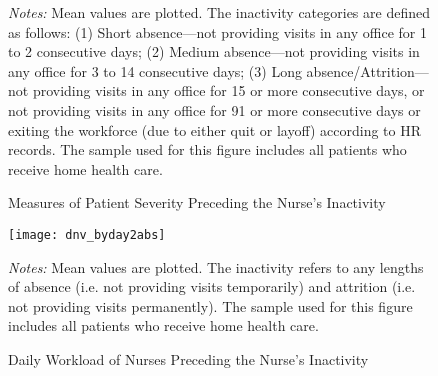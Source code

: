 \documentclass[final,12pt, notitlepage]{article}
\begin{document}
\begin{singlespace}
\graphicspath{ {/Users/kimk13/Dropbox/Wharton/Research/Labor/gph/anhandoff/} }
\begin{figure}[H]
\centering
{}
\begin{minipage}{\linewidth}
\footnotesize
\justify
\emph{Notes:} Mean values are plotted.
The inactivity categories are defined as follows:
(1) Short absence---not providing visits in any office for 1 to 2 consecutive days;
(2) Medium absence---not providing visits in any office for 3 to 14 consecutive days;
(3) Long absence/Attrition---not providing visits in any office for 15 or more consecutive days, or not providing visits in any office for 91 or more consecutive days or exiting the workforce (due to either quit or layoff) according to HR records.
The sample used for this figure includes all patients who receive home health care.
\end{minipage}
\caption[Measures of Patient Severity Preceding the Nurse's Inactivity]%
{Measures of Patient Severity Preceding the Nurse's Inactivity}
\label{fig:severity_byday}
\end{figure}

\newpage
\begin{figure}[H]
\centering
\texttt{[image: dnv\_byday2abs]}
\begin{minipage}{\linewidth}
\footnotesize
\justify
\emph{Notes:} Mean values are plotted.
The inactivity refers to any lengths of absence (i.e. not providing visits temporarily) and attrition (i.e. not providing visits permanently).
The sample used for this figure includes all patients who receive home health care.
\end{minipage}
\caption{Daily Workload of Nurses Preceding the Nurse's Inactivity}
\label{fig:dnv_byday2abs}
\end{figure}







\end{singlespace}
\end{document}
